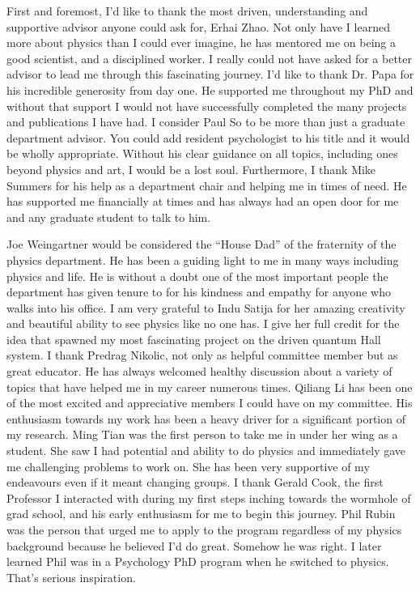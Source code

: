 
\acknowledgementspage 
\noindent First and foremost, I'd like to thank the most driven, understanding and supportive advisor anyone could ask for, Erhai Zhao. Not only have I learned more about physics than I could ever imagine, he has mentored me on being a good scientist, and a disciplined worker. I really could not have asked for a better advisor to lead me through this fascinating journey.
I'd like to thank Dr. Papa for his incredible generosity from day one. He supported me throughout my PhD and without that support I would not have successfully completed the many projects and publications I have had. 
I consider Paul So to be more than just a graduate department advisor. You could add resident psychologist to his title and it would be wholly appropriate. Without his clear guidance on all topics, including ones beyond physics and art, I would be a lost soul. 
Furthermore, I thank Mike Summers for his help as a department chair and helping me in times of need. He has supported me financially at times and has always had an open door for me and any graduate student to talk to him.

Joe Weingartner would be considered the ``House Dad'' of the fraternity of the physics department. He has been a guiding light to me in many ways including physics and life. He is without a doubt one of the most important people the department has given tenure to for his kindness and empathy for anyone who walks into his office.
I am very grateful to Indu Satija for her amazing creativity and beautiful ability to see physics like no one has. I give her full credit for the idea that spawned my most fascinating project on the driven quantum Hall system. 
I thank Predrag Nikolic, not only as helpful committee member but as great educator. He has always welcomed healthy discussion about a variety of topics that have helped me in my career numerous times.
Qiliang Li has been one of the most excited and appreciative members I could have on my committee. His enthusiasm towards my work has been a heavy driver for a significant portion of my research.
Ming Tian was the first person to take me in under her wing as a student. She saw I had potential and ability to do physics and immediately gave me challenging problems to work on. She has been very supportive of my endeavours even if it meant changing groups.
I thank Gerald Cook, the first Professor I interacted with during my first steps inching towards the wormhole of grad school, and his early enthusiasm for me to begin this journey.
Phil Rubin was the person that urged me to apply to the program regardless of my physics background because he believed I'd do great. Somehow he was right. I later learned Phil was in a Psychology PhD program when he switched to physics. That's serious inspiration.

